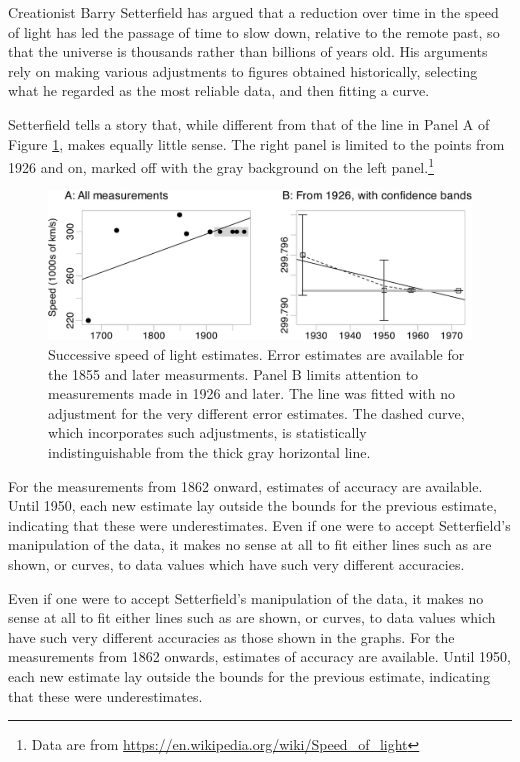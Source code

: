 \documentclass[
  10pt,
  b5paper]{book}
\begin{document}
Creationist Barry Setterfield has argued that a reduction over
time in the speed of light has led the passage of time to slow
down, relative to the remote past, so that the universe is
thousands rather than billions of years old. His arguments rely
on making various adjustments to figures obtained historically,
selecting what he regarded as the most reliable data, and
then fitting a curve.

Setterfield tells a story that, while different from that of
the line in Panel A of Figure \ref{fig:plot-c-data}, makes equally
little sense. The right panel is limited to the points from 1926
and on, marked off with the gray background on the left panel.\footnote{Data
  are from \url{https://en.wikipedia.org/wiki/Speed_of_light}}

\begin{figure}[H]

{\centering \includegraphics{08-observational_files/figure-latex/plot-c-data-1} 

}

\caption{Successive speed of light estimates.
Error estimates are available for the 1855 and later
measurments.  Panel B limits attention to measurements
made in 1926 and later. The line 
was fitted with no adjustment for the very different error
estimates.  The dashed curve, which incorporates
such adjustments, is statistically indistinguishable
from the thick gray horizontal line.}\label{fig:plot-c-data}
\end{figure}

For the measurements from 1862 onward, estimates of accuracy
are available. Until 1950, each new estimate lay outside the
bounds for the previous estimate, indicating that these
were underestimates.
Even if one were to accept Setterfield's manipulation of the data,
it makes no sense at all to fit either lines such as are shown, or
curves, to data values which have such very different
accuracies.

Even if one were to accept Setterfield's manipulation of the data,
it makes no sense at all to fit either lines such as are shown, or
curves, to data values which have such very different
accuracies as those shown in the graphs. For the
measurements from 1862 onwards, estimates of accuracy are
available. Until 1950, each new estimate lay outside the
bounds for the previous estimate, indicating that these
were underestimates.
\end{document}
